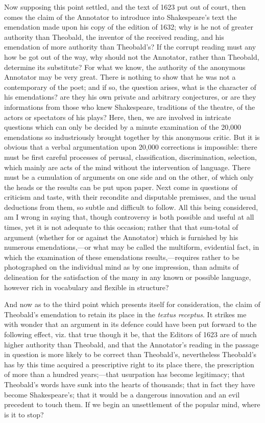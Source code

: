 Now supposing this point settled, and the text of 1623 put
out of court, then comes the claim of the Annotator to introduce into
Shakespeare's text the emendation made upon his copy of the edition of
1632; why is he not of greater authority than Theobald, the inventor
of the received reading, and his emendation of more authority than
Theobald's? If the corrupt reading must any how be got out of the way,
why should not the Annotator, rather than Theobald, determine its
substitute? For what we know, the authority of the anonymous Annotator
may be very great. There is nothing to show that he was not a
contemporary of the poet; and if so, the question arises, what is the
character of his emendations? are they his own private and arbitrary
conjectures, or are they informations from those who knew Shakespeare,
traditions of the theatre, of the actors or spectators of his plays?
Here, then, we are involved in intricate questions which can only be
decided by a minute examination of the 20,000 emendations so
industriously brought together by this anonymous critic. But it is
obvious that a verbal argumentation upon 20,000 corrections is
impossible: there must be first careful processes of perusal,
classification, discrimination, selection, which mainly are acts of
the mind without the intervention of language. There must be a
cumulation of arguments on one side and on the other, of which only
the heads or the results can be put upon paper. Next come in questions
of criticism and taste, with their recondite and disputable premisses,
and the usual deductions from them, so subtle and difficult to follow.
All this being considered, am I wrong in saying that, though
controversy is both possible and useful at all times, yet it is
not adequate to this occasion; rather that that sum-total of argument
(whether for or against the Annotator) which is furnished by his
numerous emendations,—or what may be called the multiform,
evidential fact, in which the examination of these emendations
results,—requires rather to be photographed on the individual mind
as by one impression, than admits of delineation for the satisfaction
of the many in any known or possible language, however rich in
vocabulary and flexible in structure?

And now as to the third point which presents itself for
consideration, the claim of Theobald's emendation to retain its place
in the \emph{textus receptus}. It strikes me with wonder that an
argument in its defence could have been put forward to the following
effect, viz. that true though it be, that the Editors of 1623 are of
much higher authority than Theobald, and that the Annotator's reading
in the passage in question is more likely to be correct than Theobald's,
nevertheless Theobald's has by this time acquired a prescriptive right
to its place there, the prescription of more than a hundred years;—that
usurpation has become legitimacy; that Theobald's words have sunk into
the hearts of thousands; that in fact they have become Shakespeare's;
that it would be a dangerous innovation and an evil precedent to touch
them. If we begin an unsettlement of the popular mind, where is it to
stop?

